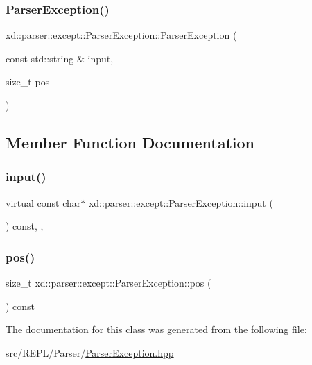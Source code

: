 \subsubsection{\texorpdfstring{Parser\+Exception()}{ParserException()}}
{\footnotesize\ttfamily xd\+::parser\+::except\+::\+Parser\+Exception\+::\+Parser\+Exception (\begin{DoxyParamCaption}\item[{const std\+::string \&}]{input,  }\item[{size\+\_\+t}]{pos }\end{DoxyParamCaption})\hspace{0.3cm}{\ttfamily [inline]}}



\subsection{Member Function Documentation}
\mbox{\label{classxd_1_1parser_1_1except_1_1_parser_exception_a6fde0ecef06df6bc2bcaef504269acea}} 
\subsubsection{\texorpdfstring{input()}{input()}}
{\footnotesize\ttfamily virtual const char$\ast$ xd\+::parser\+::except\+::\+Parser\+Exception\+::input (\begin{DoxyParamCaption}{ }\end{DoxyParamCaption}) const\hspace{0.3cm}{\ttfamily [inline]}, {\ttfamily [virtual]}, {\ttfamily [noexcept]}}

\mbox{\label{classxd_1_1parser_1_1except_1_1_parser_exception_ab58b07ce51aef576df0cfe45f0c7e222}} 
\subsubsection{\texorpdfstring{pos()}{pos()}}
{\footnotesize\ttfamily size\+\_\+t xd\+::parser\+::except\+::\+Parser\+Exception\+::pos (\begin{DoxyParamCaption}{ }\end{DoxyParamCaption}) const\hspace{0.3cm}{\ttfamily [inline]}}



The documentation for this class was generated from the following file\+:\begin{DoxyCompactItemize}
\item 
src/\+R\+E\+P\+L/\+Parser/\mbox{\hyperlink{_parser_exception_8hpp}{Parser\+Exception.\+hpp}}\end{DoxyCompactItemize}
